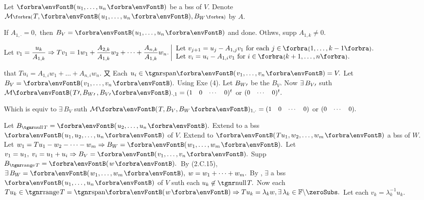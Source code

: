 \par\quad
Let $\Par{u_1,\dots,u_n}$ be a bss of $V$. Denote $\Mt[\BigPar]{T,\Par{u_1,\dots,u_n},B_W}$ by $A.$\par\quad
If $A_{1,\cdot}=0,$ then $B_V=\Par{u_1,\dots,u_n}$ and done. Othws, supp $A_{1,k}\neq 0.$\par\quad
Let $v_1={\displaystyle{\frac{u_k}{A_{1,k}}}}\Rightarrow Tv_1=1w_1+{\displaystyle{\frac{A_{2,k}}{A_{1,k}}}}w_2+\dots+{\displaystyle{\frac{A_{n,k}}{A_{1,k}}}}w_n.$\;$\MathLeftMid{l}{$
	\!\!Let $v_{j+1}=u_{j}-A_{1,j}v_1$ for each $j\in\;\!\!\Bra{1,\dots,k-1}.\\$
	\!\!Let $v_i=u_i-A_{1,i} v_1$ for $i\in\;\!\!\Bra{k+1,\dots,n}.}$\vspace{4pt}\par\quad
\NOTICE that $Tu_i=A_{1,i}w_1+\dots+A_{n,i}w_n.$ 又 Each $u_i\in\Span{v_1,\dots,v_n}=V.$ Let $B_V=\Par{v_1,\dots,v_n}.$\PfEnd\vspace{4pt}\quad
\Or Using Exe (4). Let $B_{W\prime}$ be the $B_V.$ Now $\exists\,B_{V\prime}$ suth $\Mt{T\apostrophe,B_{W\apostrophe}\,,B_{V\apostrophe}}{_{\cdot,1}}={\small\begin{pmatrix}1&0&\cdots&0\end{pmatrix}}{^t}$ or ${\small\begin{pmatrix}0&\cdots&0\end{pmatrix}}{^t}.$\par\quad
Which is equiv to $\exists\,B_V$  suth $\Mt{T,B_V,B_W}{_{1,\cdot}}={\small\begin{pmatrix}1&0&\cdots&0\end{pmatrix}}$ or ${\small\begin{pmatrix}0&\cdots&0\end{pmatrix}}.$\PfEnd
\SepLine\pagebreak

Let $B_{\null T}=\Par{u_2,\dots,u_n}.$ Extend to a bss $\Par{u_1,u_2,\dots,u_n}$ of $V.$\parSol{}
Extend to $\Par{Tu_1,w_2,\dots,w_m}$ a bss of $W.$ Let $w_1=Tu_1-w_2-\dots-w_m\Rightarrow B_W=\Par{w_1,\dots,w_m}.$\parSol{}
Let \,$v_1=u_1,\;v_i=u_1+u_i\Rightarrow B_V=\Par{v_1,\dots,v_n}.$\PfEnd\vspace{3pt}\parSol{}
\Or Supp $B_{\range T}=\Par{w}.$ \,By {\NOTEFOR} (2.C.15), $\exists\,B_W=\Par{w_1,\dots,w_m},\;w=w_1+\dots+w_m.$\parSol{}
By , $\exists$ a bss $\Par{u_1,\dots,u_n}$ of $V$ suth each $u_k\not\in\null T.$\parSol{}
Now each $Tu_k\in\range T=\Span{w}\Rightarrow Tu_k=\lambda_k w,\exists\,\lambda_k\in\nonzeroFbb.$ Let each $v_k=\lambda_k^{-1}u_k.$\PfEnd
\SepLine

